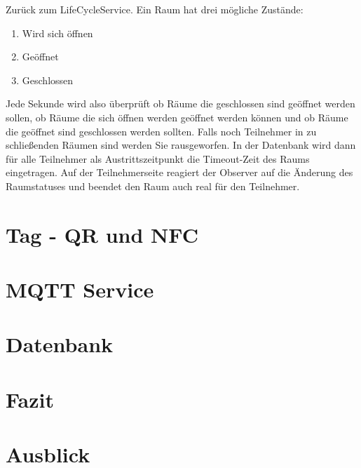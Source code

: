 Zurück zum LifeCycleService.
Ein Raum hat drei mögliche Zustände:
\begin{enumerate}
\item Wird sich öffnen
\item Geöffnet
\item Geschlossen
\end{enumerate}
 Jede Sekunde wird also überprüft ob Räume die geschlossen sind geöffnet werden sollen, ob Räume die sich öffnen werden geöffnet werden können und ob Räume die geöffnet sind geschlossen werden sollten. 
Falls noch Teilnehmer in zu schließenden Räumen sind werden Sie rausgeworfen. In der Datenbank wird dann für alle Teilnehmer als Austrittszeitpunkt die Timeout-Zeit des Raums eingetragen. 
Auf der Teilnehmerseite reagiert der Observer auf die Änderung des Raumstatuses und beendet den Raum auch real für den Teilnehmer.
\section{Tag - QR und NFC}
\label{sec:Tag - QR und NFC}
\section{MQTT Service}
\label{sec:MQTT Service}
\section{Datenbank}
\label{sec:Datenbank}
\section{Fazit}
\label{sec:Fazit}
\section{Ausblick}
\label{sec:Ausblick}
